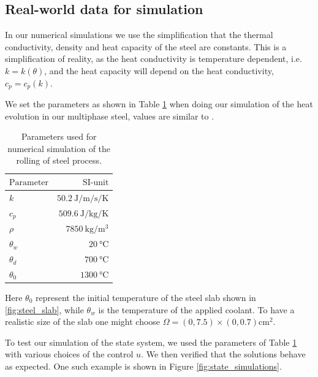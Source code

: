 \subsection{Real-world data for simulation}

In our numerical simulations we use the simplification that the thermal conductivity, density and heat capacity of the steel are constants. This is a simplification of reality, as the heat conductivity is temperature dependent, i.e. $k = k(\theta)$, and the heat capacity will depend on the heat conductivity, $c_p = c_p(k)$.


We set the parameters as shown in Table \ref{tab:chosenParam} when doing our simulation of the heat evolution in our multiphase steel, values are similar to \cite{DPSteel}. 
\begin{table}[h]
    \centering
    \caption{Parameters used for numerical simulation of the rolling of steel process.}
    \begin{tabular}{@{}lr@{}} \toprule
    $\text{Parameter}$ & $\text{SI-unit}$ \\
    \midrule
       $k$& $\SI{50.2}{\joule\per\metre\per\second\per\kelvin}$ \\
        $c_p$ & $\SI{509.6}{\joule\per\kilogram\per\kelvin}$ \\
        $\rho$ & $\SI{7850}{\kilogram\per\metre\cubed}$ \\
        $\theta_w$ & $\SI{20}{\celsius}$ \\
        $\theta_d$ & $\SI{700}{\celsius}$ \\
        $\theta_0$ & $\SI{1300}{\celsius}$ \\ \bottomrule
    \end{tabular}
    \label{tab:chosenParam}
\end{table}
Here $\theta_0$ represent the initial temperature of the steel slab shown in \ref{fig:steel_slab}, while $\theta_w$ is the temperature of the applied coolant. To have a realistic size of the slab one might choose $\Omega = (0,7.5)\times(0,0.7) \text{cm}^2$.

To test our simulation of the state system, we used the parameters of Table \ref{tab:chosenParam} with various choices of the control $u$. We then verified that the solutions behave as expected. One such example is shown in Figure \ref{fig:state_simulations}.

